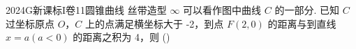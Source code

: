 
\begin{problem}{2024}{G}{新课标I卷}{11}{圆锥曲线}
丝带造型 $\infty$ 可以看作图中曲线 $C$ 的一部分. 已知 $C$ 过坐标原点 $O$，$C$ 上的点满足横坐标大于 -2，到点 $F(2,0)$ 的距离与到直线 $x=a(a<0)$ 的距离之积为 4，则
(\hspace{1cm})
\begin{choices}
\end{choices}
\end{problem}